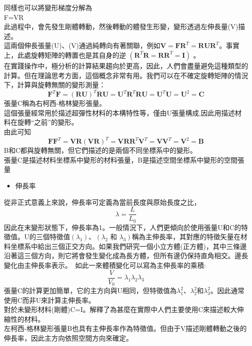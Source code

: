 同樣也可以將變形梯度分解為\\
F=VR\\
此過程中，會先發生剛體轉動，然後轉動的體發生形變，變形透過左伸長量(V)描述。\\
這兩個伸長張量(U)、(V)通過純轉向有著關聯，例如$\mathbf{V}=\mathbf{F R}^T=\mathbf{R} \mathbf{U} \mathbf{R}^T$。事實上，此處旋轉矩陣的轉置也是其自身的逆 $\left(\mathbf{R}^T \mathbf{R}=\mathbf{R R}^T=\mathbf{I}\right)$ 。\\
在實踐操作中，極分析的計算結果趨向於更高，因此，人們會盡量避免這種類型的計算。但在理論思考方面，這個概念非常有用。我們可以在不確定旋轉矩陣的情況下，計算與旋轉無關的變形測量：\
$$
\mathbf{F}^T \mathbf{F}=(\mathbf{R U})^T \mathbf{R} \mathbf{U}=\mathbf{U}^T \mathbf{R}^T \mathbf{R} \mathbf{U}=\mathbf{U}^T \mathbf{U}=\mathbf{U}^2=\mathbf{C}
$$
張量C稱為右柯西-格林變形張量。\\
這個張量經常用於描述超彈性材料的本構特性等，僅由U張量構成,因此用描述材料在旋轉“之前”的變形。\\
由此可知\
$$
\mathbf{F} \mathbf{F}^T=\mathbf{V R}(\mathbf{V R})^T=\mathbf{V R R}^T \mathbf{V}^T=\mathbf{V} \mathbf{V}^T=\mathbf{V}^2=\mathbf{B}
$$
B和C都與旋轉無關，但它們描述的是兩個不同坐標系中的變形。\\
張量C是描述材料坐標系中變形的材料張量，B是描述空間坐標系中變形的空間張量\

\begin{itemize}
\item 伸長率
\end{itemize}
從非正式意義上來說，伸長率可定義為當前長度與原始長度之比，
$$\lambda=\frac{L}{L_0}$$
因此在末變形狀態下，伸長率為1。一般情況下，人們更傾向於使用張量U和C的特徵值。U的三個特徵值$\left(\lambda_1\right)$、$\left(\lambda_2\right.$ 和 $\left.\lambda_3\right)$稱為主伸長率，其對應的特徵矢量在材料坐標系中給出三個正交方向。如果我們研究一個小立方體(正方體)，其中三條邊沿著這三個方向，則它將會發生變化成為長方體，但所有邊仍保持直角相交。邊長變化由主伸長率表示。\
如此一來體積變化可以寫為主伸長率的乘積:\
$$\frac{V}{V_0}=\lambda_1 \lambda_2 \lambda_3$$
張量C的計算更加簡單，它的主方向與U相同，但特徵值為$\lambda_1^2$、$\lambda_2^2$和$\lambda_3^2$。因此通常使用C而非U來計算主伸長率。\\
對於未變形材料(剛體)C=I。解釋了為甚麼在實際中人們主要使用C來描述較大伸縮性的材料。\\
左柯西-格林變形張量B也具有主伸長率作為特徵值。但由于V描述剛體轉動之後的伸長率，因此主方向依照空間方向來確定。\\

